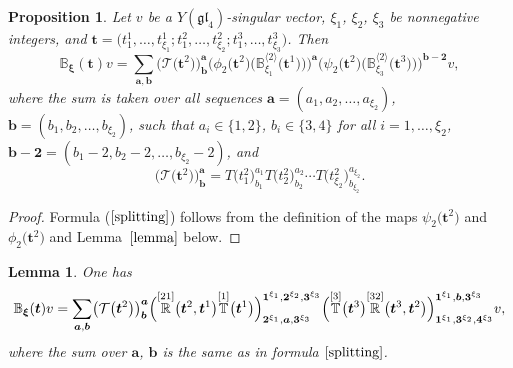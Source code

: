 \documentclass[10pt,a4paper]{amsart}
\numberwithin{equation}{section}
\newtheorem{Lemma}[Theorem]{Lemma}
\newtheorem{Proposition}[Theorem]{Proposition}
 { \theoremstyle{definition}
\newtheorem{Definition}[Theorem]{Definition}
\newtheorem*{Example}{Example}
\newtheorem*{Remark}{Remark} }
\newcommand\ltwo{\langle 2\rangle}
\begin{document}
\begin{Proposition}Let $v$ be a $Y(\mathfrak{g l}_{4})$-singular vector, $\xi_1$, $\xi_2$, $\xi_3$ be nonnegative integers, and
$\boldsymbol{t}=\bigl(t^1_1,\dots,t^1_{\xi_1};t^2_1,\dots,t^2_{\xi_2};t^3_1,\dots,t^3_{\xi_3}\bigr)$. Then
\label{propsplitting}
\begin{equation}\label{splitting}
\mathbb{B}_{\boldsymbol{\xi}}(\boldsymbol{t})v =
\sum_{\boldsymbol{a},\boldsymbol{b}} \bigl(\mathcal{T}\bigl(\boldsymbol{t}^{2}\bigr)\bigr)^{\boldsymbol{a}}_{\boldsymbol{b}}
\bigl(\phi_2\bigl(\boldsymbol{t}^ 2\bigr)\bigl(\mathbb{B}_{\xi_1}^{\ltwo}\bigl(\boldsymbol{t}^{1}\bigr)\bigr)\bigr)^{\boldsymbol{a}}
\bigl(\psi_2\bigl(\boldsymbol{t}^{2}\bigr)\bigl(\mathbb{B}_{\xi_3}^{\ltwo}\bigl(\boldsymbol{t}^{ 3}\bigr)\bigr)\bigr)^{\boldsymbol{b-2}} v,
\end{equation}
where the sum is taken over all sequences $\boldsymbol{a}=(a_1,a_2,\dots,a_{\xi_2})$, $\boldsymbol{b}=(b_1,b_2,\dots,b_{\xi_2})$, such that $a_i\in \{1,2\}$, $b_i\in \{3,4\}$ for all $i=1,\dots,\xi_2$, $\boldsymbol{b-2}=(b_1-2,b_2-2,\dots,b_{\xi_2}-2)$, and
\begin{equation*}
\bigl( \mathcal{T}\bigl(\boldsymbol{t}^2\bigr)\bigr)^{\boldsymbol{a}}_{\boldsymbol{b}}=T\bigl(t^2_1\bigr)^{a_1}_{b_1}T\bigl(t^2_2\bigr)^{a_2}_{b_2}\cdots T\bigl(t^2_{\xi_2}\bigr)^{a_{\xi_2}}_{b_{\xi_2}}.
\end{equation*}
\end{Proposition}

\begin{proof}
Formula ($\ref{splitting}$) follows from the definition of the maps $\psi_2\bigl(\boldsymbol{t}^{2}\bigr)$ and $\phi_2\bigl(\boldsymbol{t}^{2}\bigr)$ and Lemma~$\ref{lemma}$ below.
\end{proof}

\begin{Lemma}\label{lemma} One has
\begin{equation*}%
\mathbb{B}_{\boldsymbol{\xi}}(\boldsymbol{t})v=
\sum_{\boldsymbol{a},\boldsymbol{b}} \bigl( \mathcal{T}\bigl(\boldsymbol{t}^{ 2}\bigr) \bigr)^{\boldsymbol{a}}_{\boldsymbol{b}} \Bigl( \overset{[21]}{\mathbb{R}}\bigl(\boldsymbol{t}^{ 2},\boldsymbol{t}^{ 1}\bigr) \overset{[1]}{\mathbb{T}}\bigl(\boldsymbol{t}^{ 1}\bigr) \Bigr)^{\boldsymbol{1}^{\xi_1}, \boldsymbol{2}^{\xi_2}, \boldsymbol{3}^{\xi_3}}_{\boldsymbol{2}^{\xi_1}, \boldsymbol{a}, \boldsymbol{3}^{\xi_3}} \Bigl( \overset{[3]}{\mathbb{T}}\bigl(\boldsymbol{t}^{ 3}\bigr) \overset{[32]}{\mathbb{R}}\bigl(\boldsymbol{t}^{ 3},\boldsymbol{t}^{ 2}\bigr) \Bigr)^{\boldsymbol{1}^{\xi_1}, \boldsymbol{b}, \boldsymbol{3}^{\xi_3}}_{\boldsymbol{1}^{\xi_1}, \boldsymbol{3}^{\xi_2}, \boldsymbol{4}^{\xi_3}}v,
\end{equation*}
where the sum over $\boldsymbol{a}$, $\boldsymbol{b}$ is the same as in formula $\eqref{splitting}$.
\end{Lemma}
\end{document}

